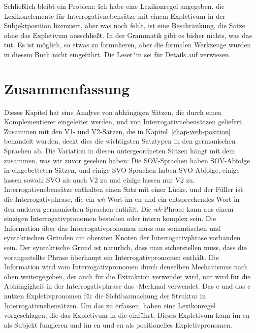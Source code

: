 Schließlich bleibt ein Problem: Ich habe eine Lexikonregel angegeben, die Lexikonelemente für
Interrogativnebensätze mit einem Expletivum in der Subjektposition lizenziert, aber was noch fehlt,
ist eine Beschränkung, die Sätze ohne das Expletivum ausschließt. In der Grammatik gibt es bisher
nichts, was das tut. Es ist möglich, so etwas zu formulieren, aber die formalen Werkzeuge wurden in
diesem Buch nicht eingeführt. Die Leser*in sei für Details auf  verwiesen.

\section{Zusammenfassung}

Dieses Kapitel hat eine Analyse von abhängigen Sätzen, die durch einen Komplementierer eingeleitet werden, und von
Interrogativnebensätzen geliefert. Zusammen mit den V1- und V2-Sätzen, die in Kapitel~\ref{chap-verb-position} behandelt wurden, deckt dies
die wichtigsten Satztypen in den germanischen Sprachen ab. Die Variation in diesen untergeordneten Sätzen
hängt mit dem zusammen, was wir zuvor gesehen haben: Die SOV-Sprachen haben SOV-Abfolge in eingebetteten Sätzen, und einige SVO-Sprachen
haben SVO-Abfolge, einige lassen sowohl SVO als auch V2 zu und einige lassen nur V2 zu. Interrogativnebensätze
enthalten einen Satz mit einer Lücke, und der Füller ist die Interrogativphrase, die ein
\emph{wh}-Wort im en und ein entsprechendes Wort in den anderen germanischen Sprachen enthält. Die \emph{wh}-Phrase
kann aus einem einzigen Interrogativpronomen bestehen oder intern komplex sein. Die Information
über das Interrogativpronomen muss aus semantischen und syntaktischen Gründen am obersten Knoten der Interrogativphrase
vorhanden sein. Der syntaktische Grund ist natürlich, dass man sicherstellen muss, dass
die vorangestellte Phrase überhaupt ein Interrogativpronomen enthält. Die Information wird vom
Interrogativpronomen durch denselben Mechanismus nach oben weitergegeben, der auch für die
Extraktion verwendet wird, nur wird für die Abhängigkeit in der Interrogativphrase das \que-Merkmal
verwendet. Das e und das e nutzen Expletivpronomen für die
Sichtbarmachung der Struktur in Interrogativnebensätzen. Um
das zu erfassen, haben  eine Lexikonregel vorgeschlagen, die das Expletivum in die
\argstl einführt. Dieses Expletivum kann im en als Subjekt fungieren und im en und
en als positionelles Expletivpronomen.%

